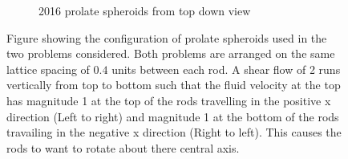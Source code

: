 \begin{figure}[!ht]
\begin{subfigure}[b]{0.475\textwidth}
            \caption[]%
            {{\small 2016 prolate spheroids from top down view}}    
            \label{fig:mean and std of net44}
        \end{subfigure}
        \caption[Images of Rods in Shear flow]
        {\small Figure showing the configuration of prolate spheroids used in the two problems considered. Both problems are arranged on the same lattice spacing of $0.4$ units between each rod. A shear flow of 2 runs vertically from top to bottom such that the fluid velocity at the top has magnitude 1 at the top of the rods travelling in the positive x direction (Left to right) and magnitude 1 at the bottom of the rods travailing in the negative x direction (Right to left). This causes the rods to want to rotate about there central axis. } 
        \label{fig:mean and std of nets}
    \end{figure}


